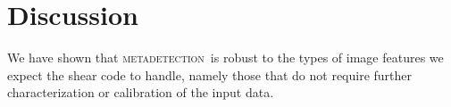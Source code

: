 \documentclass[twocolumn,twocolappendix,astrosym]{openjournal}
\newcommand{\mdet}{\textsc{metadetection}}
\begin{document}
%

\section{Discussion} \label{sec:summary}

We have shown that \mdet\ is robust to the types of image features we expect
the shear code to handle, namely those that do not require further
characterization or calibration of the input data.
\end{document}
